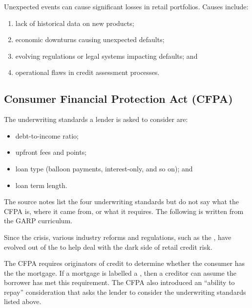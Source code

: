
\begin{crdefbox}
Unexpected events can cause significant losses in retail portfolios. Causes
include:
\begin{enumerate}[label=\alph*)]
\item lack of historical data on new products;
\item economic downturns causing unexpected defaults;
\item evolving regulations or legal systems impacting defaults; and
\item operational flaws in credit assessment processes.
\end{enumerate}
\end{crdefbox}

\subsection*{Consumer Financial Protection Act (CFPA)}

The underwriting standards a lender is asked to consider are:

\begin{itemize}
\item debt-to-income ratio;
\item upfront fees and points;
\item loan type (balloon payments, interest-only, and so on); and
\item loan term length.
\end{itemize}

\gapbadge

{\footnotesize\color{FRMGrey}The source notes list the four underwriting standards
but do not say what the CFPA is, where it came from, or what it requires. The
following is written from the GARP curriculum.}

\begin{crgapbox}
Since the crisis, various industry reforms and regulations, such as the
, have evolved out of the
 to help deal with the dark side of retail credit risk.

\smallskip
The CFPA requires originators of credit to determine whether the consumer has the
 the mortgage. If a mortgage is labelled a , then a creditor can assume the borrower has met this requirement.
The CFPA also introduced an ``ability to repay'' consideration that asks the
lender to consider the underwriting standards listed above.
\end{crgapbox}

